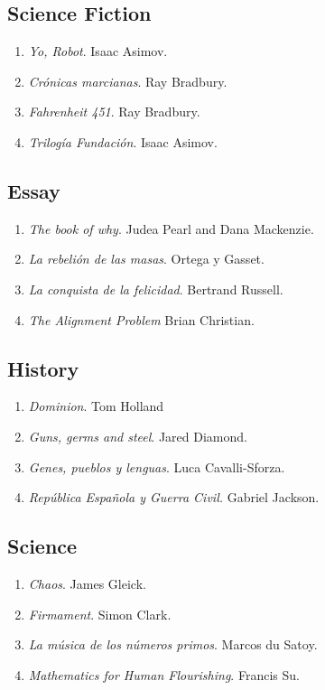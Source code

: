 \subsection*{Science Fiction}
\begin{enumerate}
  \item \emph{Yo, Robot}. Isaac Asimov.
  \item \emph{Crónicas marcianas}. Ray Bradbury.
  \item \done \emph{Fahrenheit 451}. Ray Bradbury.
  \item \done \emph{Trilogía Fundación}. Isaac Asimov.
\end{enumerate}

\subsection*{Essay}
\begin{enumerate}
  \item \emph{The book of why}. Judea Pearl and Dana Mackenzie.
  \item \emph{La rebelión de las masas}. Ortega y Gasset.
  \item \emph{La conquista de la felicidad}. Bertrand Russell.
  \item \done \emph{The Alignment Problem} Brian Christian.
\end{enumerate}

\subsection*{History}
\begin{enumerate}
  \item \emph{Dominion}. Tom Holland
  \item \emph{Guns, germs and steel}. Jared Diamond.
  \item \done \emph{Genes, pueblos y lenguas}. Luca Cavalli-Sforza.
  \item \done \emph{República Española y Guerra Civil.} Gabriel Jackson.
\end{enumerate}

\subsection*{Science}
\begin{enumerate}
  \item \done \emph{Chaos}. James Gleick.
  \item \done \emph{Firmament}. Simon Clark.
  \item \done \emph{La música de los números primos}. Marcos du Satoy.
  \item \done \emph{Mathematics for Human Flourishing}. Francis Su.
\end{enumerate}
